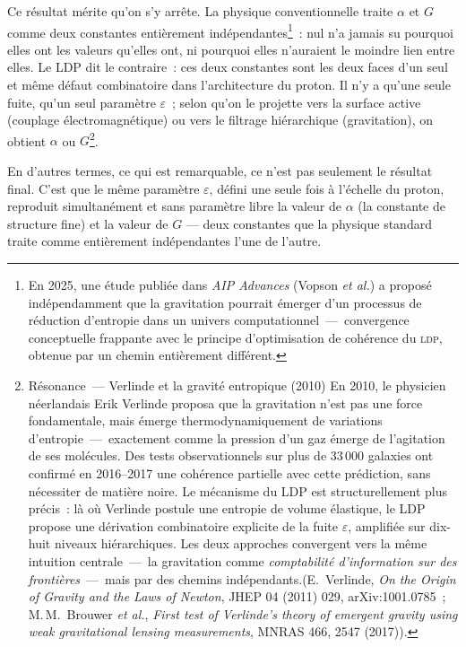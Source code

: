 \documentclass[12pt, a4paper, openright]{book}
\newcommand{\ldp}{\textsc{ldp}}
\begin{document}
Ce résultat mérite qu'on s'y arrête. La physique conventionnelle traite $\alpha$ et $G$ comme deux constantes entièrement indépendantes\footnote{En 2025, une étude publiée dans \textit{AIP Advances} (Vopson \textit{et al.}) a proposé indépendamment que la gravitation pourrait émerger d'un processus de réduction d'entropie dans un univers computationnel~---~convergence conceptuelle frappante avec le principe d'optimisation de cohérence du \ldp{}, obtenue par un chemin entièrement différent.}~: nul n'a jamais su pourquoi elles ont les valeurs qu'elles ont, ni pourquoi elles n'auraient le moindre lien entre elles. Le LDP dit le contraire~: ces deux constantes sont les deux faces d'un seul et même défaut combinatoire dans l'architecture du proton. Il n'y a qu'une seule fuite, qu'un seul paramètre $\varepsilon$~; selon qu'on le projette vers la surface active (couplage électromagnétique) ou vers le filtrage hiérarchique (gravitation), on obtient $\alpha$ ou $G$\footnote{Résonance~--- Verlinde et la gravité entropique (2010) En 2010, le physicien néerlandais Erik Verlinde proposa que la gravitation n'est pas une force fondamentale, mais émerge thermodynamiquement de variations d'entropie~---~exactement comme la pression d'un gaz émerge de l'agitation de ses molécules. Des tests observationnels sur plus de 33\,000 galaxies ont confirmé en 2016--2017 une cohérence partielle avec cette prédiction, sans nécessiter de matière noire. Le mécanisme du LDP est structurellement plus précis~: là où Verlinde postule une entropie de volume élastique, le LDP propose une dérivation combinatoire explicite de la fuite $\varepsilon$, amplifiée sur dix-huit niveaux hiérarchiques. Les deux approches convergent vers la même intuition centrale~---~la gravitation comme \emph{comptabilité d'information sur des frontières}~---~mais par des chemins indépendants.(E.\ Verlinde, \textit{On the Origin of Gravity and the Laws of Newton}, JHEP 04 (2011) 029, arXiv:1001.0785~; M.\,M.\ Brouwer \textit{et al.}, \textit{First test of Verlinde's theory of emergent gravity using weak gravitational lensing measurements}, MNRAS 466, 2547 (2017)).}.

\medskip

En d'autres termes, ce qui est remarquable, ce n'est pas seulement le résultat final. C'est que le même paramètre $\varepsilon$, défini une seule fois à l'échelle du proton, reproduit simultanément et sans paramètre libre la valeur de $\alpha$ (la constante de structure fine) et la valeur de $G$ --- deux constantes que la physique standard traite comme entièrement indépendantes l'une de l'autre.
\end{document}
